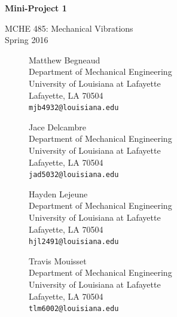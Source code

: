 \documentclass[11pt]{article}
\begin{document}
\thispagestyle{empty}
\begin{center}
\vspace*{1.5in}
{\LARGE \textbf{Mini-Project 1}} %

{\Large MCHE 485: Mechanical Vibrations\\ \vspace*{0.1in} Spring 2016}

\vspace*{2.5in}

\begin{figure}[!h]
\begin{minipage}{0.45\textwidth}
\begin{center}
Matthew Begneaud \\
Department of Mechanical Engineering\\
University of Louisiana at Lafayette\\
Lafayette, LA 70504\\
{\tt mjb4932@louisiana.edu}
\end{center}
\end{minipage}
\hspace{0.08\textwidth}
\begin{minipage}{0.45\textwidth}
\begin{center}
Jace Delcambre\\
Department of Mechanical Engineering\\
University of Louisiana at Lafayette\\
Lafayette, LA 70504\\
\tt{jad5032@louisiana.edu}
\end{center}
\end{minipage}
\end{figure}

\vspace{0.2in}
\begin{figure}[!h]
\begin{minipage}{0.45\textwidth}
\begin{center}
Hayden Lejeune \\
Department of Mechanical Engineering\\
University of Louisiana at Lafayette\\
Lafayette, LA 70504\\
{\tt hjl2491@louisiana.edu}
\end{center}
\end{minipage}
\hspace{0.08\textwidth}
\begin{minipage}{0.45\textwidth}
\begin{center}
Travis Mouisset \\
Department of Mechanical Engineering\\
University of Louisiana at Lafayette\\
Lafayette, LA 70504\\
\tt{tlm6002@louisiana.edu}
\end{center}
\end{minipage}
\end{figure}
\end{center}
\end{document}

